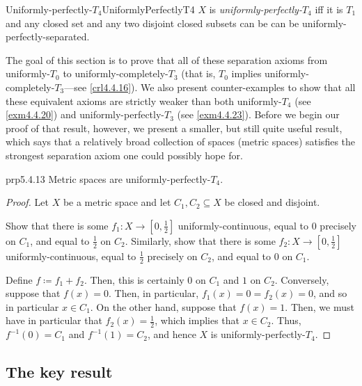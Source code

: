 \begin{dfn}{Uniformly-perfectly-$T_4$\hfill}{UniformlyPerfectlyT4}
$X$ is \emph{uniformly-perfectly-$T_4$} iff it is $T_1$ and any closed set and any two disjoint closed subsets can be can be uniformly-perfectly-separated.
\end{dfn}
The goal of this section is to prove that all of these separation axioms from uniformly-$T_0$ to uniformly-completely-$T_3$ (that is, $T_0$ implies uniformly-completely-$T_3$---see \cref{crl4.4.16}).  We also present counter-examples to show that all these equivalent axioms are strictly weaker than both uniformly-$T_4$ (see \cref{exm4.4.20}) and uniformly-perfectly-$T_3$ (see \cref{exm4.4.23}).  Before we begin our proof of that result, however, we present a smaller, but still quite useful result, which says that a relatively broad collection of spaces (metric spaces) satisfies the strongest separation axiom one could possibly hope for.
\begin{prp}{}{prp5.4.13}
Metric spaces are uniform\-ly-perfectly-$T_4$.
\begin{proof}
Let $X$ be a metric space and let $C_1,C_2\subseteq X$ be closed and disjoint.
\begin{exr}[breakable=false]{}{}
Show that there is some $f_1:X\rightarrow [0,\frac{1}{2}]$ uniformly-continuous, equal to $0$ precisely on $C_1$, and equal to $\frac{1}{2}$ on $C_2$.  Similarly, show that there is some $f_2:X\rightarrow [0,\frac{1}{2}]$ uniformly-continuous, equal to $\frac{1}{2}$ precisely on $C_2$, and equal to $0$ on $C_1$.
\end{exr}
Define $f\coloneqq f_1+f_2$.  Then, this is certainly $0$ on $C_1$ and $1$ on $C_2$.  Conversely, suppose that $f(x)=0$.  Then, in particular, $f_1(x)=0=f_2(x)=0$, and so in particular $x\in C_1$.  On the other hand, suppose that $f(x)=1$.  Then, we must have in particular that $f_2(x)=\frac{1}{2}$, which implies that $x\in C_2$.  Thus, $f^{-1}(0)=C_1$ and $f^{-1}(1)=C_2$, and hence $X$ is uniformly-perfectly-$T_4$.
\end{proof}
\end{prp}

\subsection{The key result}

